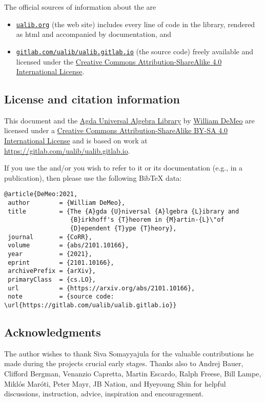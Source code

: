 \noindent The official sources of information about the \agdaualib are
\begin{itemize}
  \item \href{https://ualib.gitlab.io}{\texttt{ualib.org}} (the web site) includes every line of code in the library, rendered as html and accompanied by documentation, and
  \item \href{https://gitlab.com/ualib/ualib.gitlab.io}{\texttt{gitlab.com/ualib/ualib.gitlab.io}} (the source code) freely available and licensed under the \href{https://creativecommons.org/licenses/by-sa/4.0/}{Creative Commons Attribution-ShareAlike 4.0 International License}.
\end{itemize}


\subsection*{License and citation information}
This document and the \href{https://gitlab.com/ualib/ualib.gitlab.io/}{Agda Universal Algebra Library} by \href{mailto:williamdemeo@gmail.com}{William DeMeo} are licensed under a \href{http://creativecommons.org/licenses/by-sa/4.0/}{Creative Commons Attribution-ShareAlike BY-SA 4.0 International License} and is based on work at \url{https://gitlab.com/ualib/ualib.gitlab.io}.

If you use the \agdaualib and/or you wish to refer to it or its documentation (e.g., in a publication), then please use the following BibTeX data:

{\small
\begin{verbatim}
@article{DeMeo:2021,
 author        = {William DeMeo},
 title         = {The {A}gda {U}niversal {A}lgebra {L}ibrary and 
                  {B}irkhoff's {T}heorem in {M}artin-{L}\"of 
                  {D}ependent {T}ype {T}heory}, 
 journal       = {CoRR},
 volume        = {abs/2101.10166},
 year          = {2021},
 eprint        = {2101.10166},
 archivePrefix = {arXiv},
 primaryClass  = {cs.LO},
 url           = {https://arxiv.org/abs/2101.10166},
 note          = {source code: \url{https://gitlab.com/ualib/ualib.gitlab.io}}
\end{verbatim}
}

\subsection*{Acknowledgments}
The author wishes to thank Siva Somayyajula for the valuable contributions he made during the projects crucial early stages. Thanks also to Andrej Bauer, Clifford Bergman, Venanzio Capretta, Martin Escardo, Ralph Freese, Bill Lampe, Miklós Maróti, Peter Mayr, JB Nation, and Hyeyoung Shin for helpful discussions, instruction, advice, inspiration
and encouragement.

